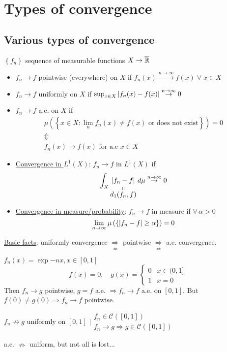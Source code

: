 \newpage
\section{Types of convergence}
\subsection{Various types of convergence}
\(\left\lbrace f_n \right\rbrace\) sequence of measurable functions \(X \to \barreal\)
\begin{itemize}
    \item \(f_n \to f\) pointwise (everywhere) on \(X\) if \(f_n(x) \overset{n \to \infty}{\to} f(x) \; \forall \; x \in X\)
    \item \(f_n \to f\) uniformly on \(X\) if \(\sup_{x \in X} \abs{f_n(x) - f(x)} \overset{n \to \infty}{\to} 0\)
    \item \(f_n \to f\) a.e. on \(X\) if 
    \[
        \begin{array}{c}
            \mu\left(\left\{ x \in X : \lim_n f_n(x) \neq f(x) \mbox{ or does not exist} \right\}\right) = 0 \\
            \Updownarrow \\
            f_n(x) \to f(x) \mbox{ for a.e } x \in X
        \end{array}
    \]
    \item \underline{Convergence in \(L^1(X)\)}: \(f_n \to f\) in \(L^1(X)\) if 
    \[
        \int_X \stackbelow{\abs{f_n - f}}{d_1(f_n, f)} \, d\mu \overset{n\to \infty}{\to} 0
    \]
    \item \underline{Convergence in measure/probability}: \(f_n \to f\) in measure if \(\forall \, \alpha > 0\)
    \[
        \lim_{n\to \infty} \mu\left(\left\{ \abs{f_n - f} \geq \alpha \right\}\right) = 0
    \]
\end{itemize}
\noindent\underline{Basic facts}: uniformly convergence \(\underset{\displaystyle\nLeftarrow}{\Rightarrow}\) pointwise \(\underset{\displaystyle\nLeftarrow}{\Rightarrow}\) a.e. convergence.

\begin{example}
    \(f_n (x) = \exp{-nx}, x \in [0,1]\)
    \[
        f(x) = 0, \quad g(x) = \begin{cases}
            0 & x \in (0, 1]\\ 1 & x = 0
        \end{cases}
    \]
    Then \(f_n \to g\) pointwise, \(g = f\) a.e. \(\Rightarrow f_n \to f\) a.e. on \([0,1]\). But \(f(0) \neq g(0) \Rightarrow f_n \to f\) pointwise. 
    
    \(f_n \nrightarrow g\) uniformly on \([0,1]\) \(\bigg\lvert \begin{array}{l}
        f_n \in \mathcal{C}([0,1]) \\ f_n \to g \Rightarrow g \in \mathcal{C}([0,1])
    \end{array}\)
    
    a.e. \(\nRightarrow\) uniform, but not all is lost...
\end{example}
